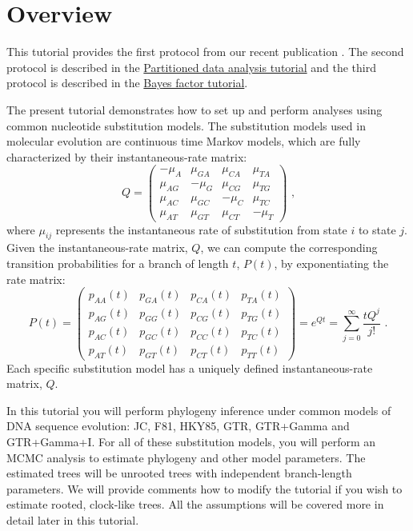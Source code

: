 \section{Overview}

This tutorial provides the first protocol from our recent publication \citep{Hoehna2017a}.
The second protocol is described in the \href{https://github.com/revbayes/revbayes_tutorial/raw/master/tutorial_TeX/RB_Partition_Tutorial/RB_Partition_Tutorial.pdf}{Partitioned data analysis tutorial} and the third protocol is described in the \href{https://github.com/revbayes/revbayes_tutorial/raw/master/tutorial_TeX/RB_BayesFactor_Tutorial/RB_BayesFactor_Tutorial.pdf}{Bayes factor tutorial}.

The present tutorial demonstrates how to set up and perform analyses using common nucleotide substitution models. 
The substitution models used in molecular evolution are continuous time Markov models, which are fully characterized by their instantaneous-rate matrix:
\begin{equation*}
Q = \begin{pmatrix} -\mu_A & \mu_{GA} & \mu_{CA} & \mu_{TA} \\
\mu_{AG} & -\mu_G  & \mu_{CG} & \mu_{TG} \\
\mu_{AC} & \mu_{GC} & -\mu_C  & \mu_{TC} \\
\mu_{AT} & \mu_{GT} & \mu_{CT} & -\mu_T 
\end{pmatrix} \mbox{  ,}
\end{equation*}
where $\mu_{ij}$ represents the instantaneous rate of substitution from state $i$ to state $j$. Given the instantaneous-rate matrix, $Q$, we can compute the corresponding transition probabilities for a branch of length $t$, $P(t)$, by exponentiating the rate matrix:
\begin{equation*}
P(t) = \begin{pmatrix}          
p_{AA}(t) & p_{GA}(t) & p_{CA}(t) & p_{TA}(t) \\
p_{AG}(t) & p_{GG}(t) & p_{CG}(t) & p_{TG}(t) \\
p_{AC}(t) & p_{GC}(t) & p_{CC}(t) & p_{TC}(t) \\
p_{AT}(t) & p_{GT}(t) & p_{CT}(t) & p_{TT}(t)
\end{pmatrix} = e^{Qt} = \sum_{j=0}^\infty\frac{tQ^j}{j!} \mbox{  .}
\end{equation*}
Each specific substitution model has a uniquely defined instantaneous-rate matrix, $Q$.


In this tutorial you will perform phylogeny inference under common models of DNA sequence evolution: JC, F81, HKY85, GTR, GTR+Gamma and GTR+Gamma+I.
For all of these substitution models, you will perform an MCMC analysis to estimate phylogeny and other model parameters.
The estimated trees will be unrooted trees with independent branch-length parameters. 
We will provide comments how to modify the tutorial if you wish to estimate rooted, clock-like trees.
All the assumptions will be covered more in detail later in this tutorial.

